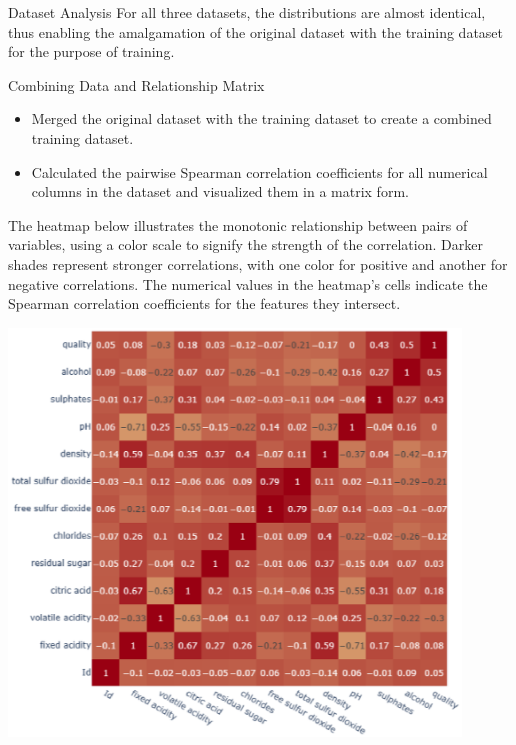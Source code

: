 \documentclass[
 size=14pt,
 paper=smartboard,  %
 mode=present, 		%
 display=slides, 	%
 style=tuliplab,  	%
 pauseslide,
 fleqn,leqno]{powerdot}
\begin{document}
\begin{slide}[toc=]{Dataset Analysis}
	For all three datasets, the distributions are almost identical, thus enabling the amalgamation of the original dataset with the training dataset for the purpose of training.
	
	
\end{slide}
\begin{slide}[toc=]{Combining Data and Relationship Matrix}
	\begin{itemize}
		\item Merged the original dataset with the training dataset to create a combined training dataset.
		\item Calculated the pairwise Spearman correlation coefficients for all numerical columns in the dataset and visualized them in a matrix form.
	\end{itemize}

\begin{minipage}[c]{0.48\textwidth}
	The heatmap below illustrates the monotonic relationship between pairs of variables, using a color scale to signify the strength of the correlation. Darker shades represent stronger correlations, with one color for positive and another for negative correlations. The numerical values in the heatmap's cells indicate the Spearman correlation coefficients for the features they intersect.
\end{minipage}
\hfill
\begin{minipage}[c]{0.48\textwidth}
		\includegraphics[width=0.9\textwidth]{tex/CombinedTrainingDataset}
\end{minipage}
\end{slide}
\end{document}
